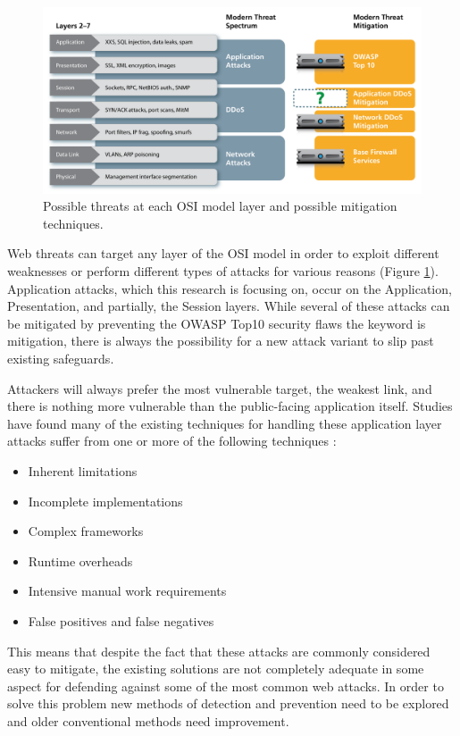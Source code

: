 \begin{figure}
	\includegraphics[width=450px]{./assets/img/osithreats.png}
	\caption{Possible threats at each OSI model layer and possible mitigation techniques. {\cite{f5whitepaper}} }
	\label{fig:osithreats}
\end{figure}

Web threats can target any layer of the OSI model in order to exploit different weaknesses or perform different types of attacks for various reasons (Figure \ref{fig:osithreats}).  Application attacks, which this research is focusing on, occur on the Application, Presentation, and partially, the Session layers.  While several of these attacks can be mitigated by preventing the OWASP Top10 security flaws the keyword is mitigation, there is always the possibility for a new attack variant to slip past existing safeguards.

Attackers will always prefer the most vulnerable target, the weakest link, and there is nothing more vulnerable than the public-facing application itself.  Studies have found many of the existing techniques for handling these application layer attacks suffer from one or more of the following techniques \cite{aSurveyOnWeb}:

\begin{itemize}
	\item Inherent limitations
	\item Incomplete implementations
	\item Complex frameworks
	\item Runtime overheads
	\item Intensive manual work requirements
	\item False positives and false negatives
\end{itemize}

This means that despite the fact that these attacks are commonly considered easy to mitigate, the existing solutions are not completely adequate in some aspect for defending against some of the most common web attacks.  In order to solve this problem new methods of detection and prevention need to be explored and older conventional methods need improvement.

